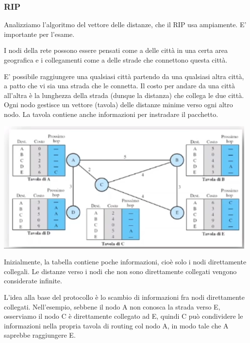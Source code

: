         \subsubsection{RIP}
            
            Analizziamo l'algoritmo del vettore delle distanze, che il RIP usa ampiamente. E' importante per l'esame.
            
            \vspace{3mm}
            
            I nodi della rete possono essere pensati come a delle città in una certa area geografica e i collegamenti come a delle strade che connettono questa città.
            
            E' possibile raggiungere una qualsiasi città partendo da una qualsiasi altra città, a patto che vi sia una strada che le connetta. Il costo per andare da una città all'altra è la lunghezza della strada (dunque la distanza) che collega le due città. Ogni nodo gestisce un vettore (tavola) delle distanze minime verso ogni altro nodo. La tavola contiene anche informazioni per instradare il pacchetto.
            
            \begin{center}
                \includegraphics[scale=0.5]{images/Vector.png}
            \end{center}
            
            Inizialmente, la tabella contiene poche informazioni, cioè solo i nodi direttamente collegali. Le distanze verso i nodi che non sono direttamente collegati vengono considerate infinite.
            
            L'idea alla base del protocollo è lo scambio di informazioni fra nodi direttamente collegati. Nell'esempio, sebbene il nodo A non conosca la strada verso E, osserviamo il nodo C è direttamente collegato ad E, quindi C può condividere le informazioni nella propria tavola di routing col nodo A, in modo tale che A saprebbe raggiungere E.
            
